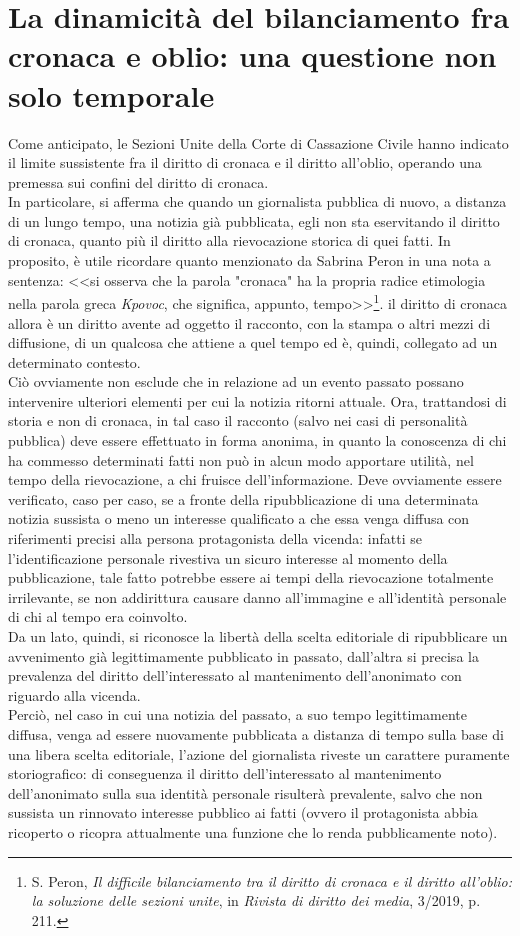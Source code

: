 \section{La dinamicità del bilanciamento fra cronaca e oblio: una questione non solo temporale}
Come anticipato, le Sezioni Unite della Corte di Cassazione Civile hanno indicato il limite sussistente fra il diritto di cronaca e il diritto all'oblio, operando una premessa sui confini del diritto di cronaca.
\\In particolare, si afferma che quando un giornalista pubblica di nuovo, a distanza di un lungo tempo, una notizia già pubblicata, egli non sta eservitando il diritto di cronaca, quanto più il diritto alla rievocazione storica di quei fatti. In proposito, è utile ricordare quanto menzionato da Sabrina Peron in una nota a sentenza: <<si osserva che la parola "cronaca" ha la propria radice etimologia nella parola greca \textit{Kpovoc}, che significa, appunto, tempo>>\footnote{S. Peron, \textit{Il difficile bilanciamento tra il diritto di cronaca e il diritto all’oblio: la soluzione delle sezioni unite}, in \textit{Rivista di diritto dei media}, 3/2019, p. 211.}.
il diritto di cronaca allora è un diritto avente ad oggetto il racconto, con la stampa o altri mezzi di diffusione, di un qualcosa che attiene a quel tempo ed è, quindi, collegato ad un determinato contesto.
\\Ciò ovviamente non esclude che in relazione ad un evento passato possano intervenire ulteriori elementi per cui la notizia ritorni attuale.
Ora, trattandosi di storia e non di cronaca, in tal caso il racconto (salvo nei casi di personalità pubblica) deve essere effettuato in forma anonima, in quanto la conoscenza di chi ha commesso determinati fatti non può in alcun modo apportare utilità, nel tempo della rievocazione, a chi fruisce dell'informazione.
Deve ovviamente essere verificato, caso per caso, se a fronte della ripubblicazione di una determinata notizia sussista o meno un interesse qualificato a che essa venga diffusa con riferimenti precisi alla persona protagonista della vicenda: infatti se l'identificazione personale rivestiva un sicuro interesse al momento della pubblicazione, tale fatto potrebbe essere ai tempi della rievocazione totalmente irrilevante, se non addirittura causare danno all'immagine e all'identità personale di chi al tempo era coinvolto.
\\Da un lato, quindi, si riconosce la libertà della scelta editoriale di ripubblicare un avvenimento già legittimamente pubblicato in passato, dall'altra si precisa la prevalenza del diritto dell'interessato al mantenimento dell'anonimato con riguardo alla vicenda.
\\Perciò, nel caso in cui una notizia del passato, a suo tempo legittimamente diffusa, venga ad essere nuovamente pubblicata a distanza di tempo sulla base di una libera scelta editoriale, l'azione del giornalista riveste un carattere puramente storiografico: di conseguenza il diritto dell'interessato al mantenimento dell'anonimato sulla sua identità personale risulterà prevalente, salvo che non sussista un rinnovato interesse pubblico ai fatti (ovvero il protagonista abbia ricoperto o ricopra attualmente una funzione che lo renda pubblicamente noto).

